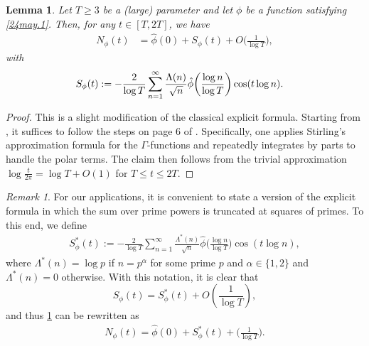 \documentclass[12pt,oneside,english,a4paper]{amsart}
\newtheorem{lem}[thm]{Lemma}
\theoremstyle{remark}
\newtheorem{rem}[thm]{Remark}
\numberwithin{equation}{section}
\newcommand{\Starphi}{S_\phi^*}
\begin{document}
\begin{lem}\label{ExplForm_SumOverZeros}
    Let $T \ge 3$ be a (large) parameter and let $\phi$ be a function satisfying \eqref{24may.1}. Then, for any $t\in[T,2T]$, we have
    \begin{align*}
        N_\phi(t) 
        &= \hat\phi(0) + S_\phi(t) + O\bigg(\frac{1}{\log T}\bigg),
    \end{align*}
    with
    \begin{align*}\notag
        S_\phi(t) &:= -\frac{2}{\log T} \sum_{n=1}^{\infty} \frac{\Lambda(n)}{\sqrt{n}} \hat\phi \bigg(\frac{\log n}{\log T}\bigg) \cos(t\log n).
    \end{align*}
\end{lem}

\begin{proof}
    This is a slight modification of the classical explicit formula. Starting from \cite[Lemma 2.1]{HughesRudnick}, it suffices to follow the steps on page 6 of \cite{BettinFazza}. Specifically, one applies Stirling's approximation formula for the $\Gamma$-functions and repeatedly integrates by parts to handle the polar terms. The claim then follows from the trivial approximation $\log\frac{t}{2\pi}=\log T +O(1)$ for $T\leq t\leq 2T$.
\end{proof}

\begin{rem}\label{Rem_SvsS*}
    For our applications, it is convenient to state a version of the explicit formula in which the sum over prime powers is truncated at squares of primes. To this end, we define
    \begin{align*}\Starphi(t) := -\frac{2}{\log T} \sum_{n=1}^{\infty} \frac{\Lambda^*(n)}{\sqrt{n}} \hat\phi \bigg(\frac{\log n}{\log T}\bigg) \cos(t\log n),
    \end{align*}
    where $\Lambda^*(n)=\log p$ if $n=p^\alpha$ for some prime $p$ and $\alpha \in \{1,2\}$ and $\Lambda^*(n) = 0$ otherwise. With this notation, it is clear that 
    \begin{equation}\label{SS*Comp}
    S_\phi(t) = \Starphi(t) + O\left(\frac{1}{\log T}\right),
    \end{equation}
    and thus \cref{ExplForm_SumOverZeros} can be rewritten as
    \begin{align}\label{ExplFormS*}
    N_\phi(t) = \hat\phi(0) +\Starphi(t)+\bigg(\frac{1}{\log T}\bigg).
    \end{align} 
\end{rem}
\end{document}
